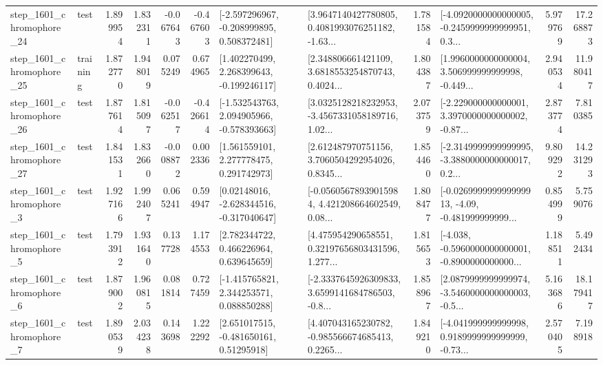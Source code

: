\begin{tabular}{llrrrrllrlrr}
 step\_1601\_chromophore\_24 &      test &      1.899954 &    1.832311 &     -0.067643 & -0.467603 &   [-2.597296967, -0.208999895, 0.508372481] &  [3.9647140427780805, 0.4081993076251182, -1.63... &       1.781584 &  [-4.0920000000000005, -0.2459999999999951, 0.3... &            5.979769 &         17.268873 \\
 step\_1601\_chromophore\_25 &  training &      1.872770 &    1.948019 &      0.075249 &  0.674965 &    [1.402270499, 2.268399643, -0.199246117] &  [2.348806661421109, 3.6818553254870743, 0.4024... &       1.804387 &  [1.9960000000000004, 3.506999999999998, -0.449... &            2.940534 &         11.980417 \\
 step\_1601\_chromophore\_26 &      test &      1.877614 &    1.815097 &     -0.062517 & -0.426614 &   [-1.532543763, 2.094905966, -0.578393663] &  [3.0325128218232953, -3.4567331058189716, 1.02... &       2.073759 &  [-2.229000000000001, 3.3970000000000002, -0.87... &            2.873774 &          7.810385 \\
 step\_1601\_chromophore\_27 &      test &      1.841531 &    1.832660 &     -0.008872 &  0.002336 &     [1.561559101, 2.277778475, 0.291742973] &  [2.612487970751156, 3.7060504292954026, 0.8345... &       1.854460 &  [-2.3149999999999995, -3.3880000000000017, 0.2... &            9.809292 &         14.231293 \\
  step\_1601\_chromophore\_3 &      test &      1.927166 &    1.992407 &      0.065241 &  0.594947 &    [0.02148016, -2.628344516, -0.317040647] &  [-0.05605678939015984, 4.421208664602549, 0.08... &       1.808477 &  [-0.026999999999999913, -4.09, -0.481999999999... &            0.854999 &          5.759076 \\
  step\_1601\_chromophore\_5 &      test &      1.793912 &    1.931640 &      0.137728 &  1.174553 &     [2.782344722, 0.466226964, 0.639645659] &  [4.475954290658551, 0.32197656803431596, 1.277... &       1.815653 &  [-4.038, -0.5960000000000001, -0.8900000000000... &            1.188511 &          5.492434 \\
  step\_1601\_chromophore\_6 &      test &      1.879002 &    1.960815 &      0.081814 &  0.727459 &    [-1.415765821, 2.344253571, 0.088850288] &  [-2.3337645926309833, 3.6599141684786503, -0.8... &       1.858967 &  [2.0879999999999974, -3.5460000000000003, -0.5... &            5.163686 &         18.179417 \\
  step\_1601\_chromophore\_7 &      test &      1.890539 &    2.034238 &      0.143698 &  1.222292 &     [2.651017515, -0.481650161, 0.51295918] &  [4.407043165230782, -0.985566674685413, 0.2265... &       1.849210 &  [-4.041999999999998, 0.9189999999999999, -0.73... &            2.570405 &          7.198918 \\

\end{tabular}
